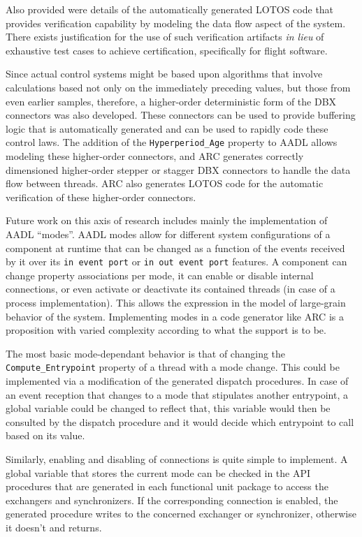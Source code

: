 Also provided were details of the automatically generated LOTOS code
that provides verification capability by modeling the data flow aspect
of the system. There exists justification for the use of such
verification artifacts \emph{in lieu} of exhaustive test cases to
achieve certification, specifically for flight software.

Since actual control systems might be based upon algorithms that
involve calculations based not only on the immediately preceding
values, but those from even earlier samples, therefore, a higher-order
deterministic form of the DBX connectors was also developed. These
connectors can be used to provide buffering logic that is
automatically generated and can be used to rapidly code these control
laws. The addition of the \texttt{Hyperperiod\_Age} property to AADL
allows modeling these higher-order connectors, and ARC generates
correctly dimensioned higher-order stepper or stagger DBX connectors
to handle the data flow between threads. ARC also generates LOTOS code
for the automatic verification of these higher-order connectors.

Future work on this axis of research includes mainly the
implementation of AADL ``modes''. AADL modes allow for different
system configurations of a component at runtime that can be changed as
a function of the events received by it over its \texttt{in event port}
or \texttt{in out event port} features. A component can change
property associations per mode, it can enable or disable internal
connections, or even activate or deactivate its contained threads (in
case of a process implementation). This allows the expression in the
model of large-grain behavior of the system. Implementing modes in
a code generator like ARC is a proposition with varied complexity
according to what the support is to be.

The most basic mode-dependant behavior is that of changing the
\texttt{Compute\_Entrypoint} property of a thread with a mode
change. This could be implemented via a modification of the generated
dispatch procedures. In case of an event reception that changes to a
mode that stipulates another entrypoint, a global variable could be
changed to reflect that, this variable would then be consulted by the
dispatch procedure and it would decide which entrypoint to call based
on its value.

Similarly, enabling and disabling of connections is quite simple to
implement. A global variable that stores the current mode can be
checked in the API procedures that are generated in each functional
unit package to access the exchangers and synchronizers. If the
corresponding connection is enabled, the generated procedure writes to
the concerned exchanger or synchronizer, otherwise it doesn't and
returns.

